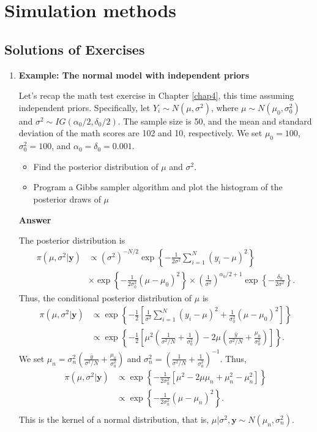 \chapter{Simulation methods}\label{chap5}

\section{Solutions of Exercises}\label{sec51}
\begin{enumerate}[leftmargin=*]
\item \textbf{Example: The normal model with independent priors}

Let's recap the math test exercise in Chapter \ref{chap4}, this time assuming independent priors. Specifically, let $Y_i \sim N(\mu, \sigma^2)$, where $\mu \sim N(\mu_0, \sigma_0^2)$ and $\sigma^2 \sim IG(\alpha_0 / 2, \delta_0 / 2)$. The sample size is 50, and the mean and standard deviation of the math scores are 102 and 10, respectively. We set $\mu_0 = 100$, $\sigma_0^2 = 100$, and $\alpha_0 = \delta_0 = 0.001$.

\begin{itemize}
	\item Find the posterior distribution of $\mu$ and $\sigma^2$.
	\item Program a Gibbs sampler algorithm and plot the histogram of the posterior draws of $\mu$
\end{itemize}

\textbf{Answer}

The posterior distribution is
\begin{align*}
	\pi(\mu,\sigma^2|\bm{y})&\propto (\sigma^2)^{-N/2}\exp\left\{-\frac{1}{2\sigma^2}\sum_{i=1}^N(y_i-\mu)^2\right\}\\
	&\times \exp\left\{-\frac{1}{2\sigma^2_0}(\mu-\mu_0)^2\right\}\times \left(\frac{1}{\sigma^2}\right)^{\alpha_0/2+1}\exp\left\{-\frac{\delta_0}{2\sigma^2}\right\}.
\end{align*}
Thus, the conditional posterior distribution of $\mu$ is
\begin{align*}
	\pi(\mu,\sigma^2|\bm{y})&\propto \exp\left\{-\frac{1}{2}\left[\frac{1}{\sigma^2}\sum_{i=1}^N(y_i-\mu)^2+\frac{1}{\sigma^2_0}(\mu-\mu_0)^2\right]\right\}\\
	&\propto \exp\left\{-\frac{1}{2}\left[\mu^2\left(\frac{1}{\sigma^2/N}+\frac{1}{\sigma^2_0}\right)-2\mu\left(\frac{\bar{y}}{\sigma^2/N}+\frac{\mu_0}{\sigma_0^2}\right)\right]\right\}.  
\end{align*} 
We set $\mu_n=\sigma^{2}_n\left(\frac{\bar{y}}{\sigma^2/N}+\frac{\mu_0}{\sigma_0^2}\right)$ and $\sigma^{2}_n=\left(\frac{1}{\sigma^2/N}+\frac{1}{\sigma_0^2}\right)^{-1}$. Thus,
\begin{align*}
	\pi(\mu,\sigma^2|\bm{y})&\propto \exp\left\{-\frac{1}{2\sigma_n^2}\left[\mu^2-2\mu\mu_n+\mu_n^2-\mu_n^2\right]\right\}\\
	&\propto \exp\left\{-\frac{1}{2\sigma_n^2}(\mu-\mu_n)^2\right\}.\\  
\end{align*} 
This is the kernel of a normal distribution, that is, $\mu|\sigma^2,\bm{y}\sim N(\mu_n,\sigma_n^2)$.


\end{enumerate}
